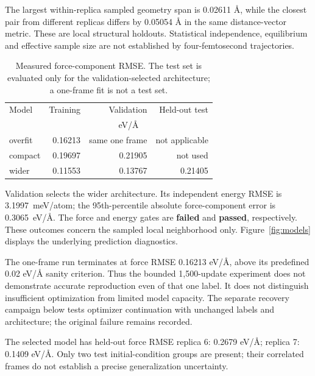 The largest within-replica sampled geometry span is 0.02611 \AA, while the closest pair from different replicas differs by 0.05054 \AA{} in the same distance-vector metric. These are local structural holdouts. Statistical independence, equilibrium and effective sample size are not established by four-femtosecond trajectories.

\begin{table}[ht]\centering\small

\caption{Measured force-component RMSE. The test set is evaluated only for the validation-selected architecture; a one-frame fit is not a test set.}

\begin{tabular}{lrrr}\toprule Model & Training & Validation & Held-out test\\ & \multicolumn{3}{c}{eV/\AA}\\\midrule

overfit & 0.16213 & same one frame & not applicable\\

compact & 0.19697 & 0.21905 & not used\\

wider & 0.11553 & 0.13767 & 0.21405\\

\bottomrule\end{tabular}\end{table}

Validation selects the wider architecture. Its independent energy RMSE is 3.1997~meV/atom; the 95th-percentile absolute force-component error is 0.3065~eV/\AA. The force and energy gates are \textbf{failed} and \textbf{passed}, respectively. These outcomes concern the sampled local neighborhood only. Figure~\ref{fig:models} displays the underlying prediction diagnostics.

The one-frame run terminates at force RMSE 0.16213 eV/\AA, above its predefined 0.02 eV/\AA{} sanity criterion. Thus the bounded 1,500-update experiment does not demonstrate accurate reproduction even of that one label. It does not distinguish insufficient optimization from limited model capacity. The separate recovery campaign below tests optimizer continuation with unchanged labels and architecture; the original failure remains recorded.

The selected model has held-out force RMSE replica 6: 0.2679 eV/\AA; replica 7: 0.1409 eV/\AA. Only two test initial-condition groups are present; their correlated frames do not establish a precise generalization uncertainty.

